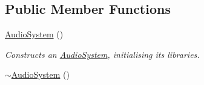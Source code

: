 \subsection*{Public Member Functions}
\begin{DoxyCompactItemize}
\item 
\hyperlink{classAudioSystem_ad17cde8deff07ef7d7d56be62df98739}{Audio\+System} ()
\begin{DoxyCompactList}\small\item\em Constructs an \hyperlink{classAudioSystem}{Audio\+System}, initialising its libraries. \end{DoxyCompactList}\item 
\hypertarget{classAudioSystem_a9ad830040ea5f68a6a63957c6f281055}{\hyperlink{classAudioSystem_a9ad830040ea5f68a6a63957c6f281055}{$\sim$\+Audio\+System} ()}\label{classAudioSystem_a9ad830040ea5f68a6a63957c6f281055}


\end{DoxyCompactItemize}
